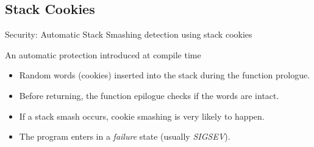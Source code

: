 \subsection{Stack Cookies}
\begin{frame}{Security: Automatic Stack Smashing detection using stack cookies}
	\begin{block}{An automatic protection introduced at compile time}
	\begin{itemize}
		\item Random words (cookies) inserted into the stack during the function prologue.
		\item Before returning, the function epilogue checks if the words are intact.
		\item If a stack smash occurs, cookie smashing is very likely to happen.
		\item The program enters in a \emph{failure} state (usually \emph{SIGSEV}).
	\end{itemize}
	\end{block}
\end{frame}

